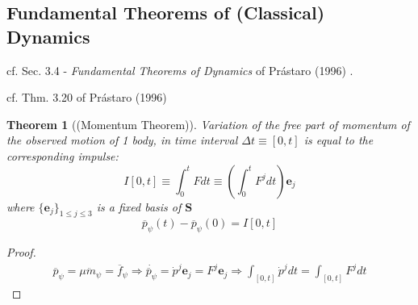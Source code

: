 \documentclass[10pt]{amsart}
\newtheorem{theorem}{Theorem}
\begin{document}
\begin{multicols*}{2}
\subsection{Fundamental Theorems of (Classical) Dynamics}

cf. Sec. 3.4 - \emph{Fundamental Theorems of Dynamics} of Pr\'{a}staro (1996) \cite{Pras1996}.

cf. Thm. 3.20 of Pr\'{a}staro (1996) \cite{Pras1996}
\begin{theorem}[(Momentum Theorem)]
	Variation of the free part of momentum of the observed motion of 1 body, in time interval $\Delta t \equiv [0, t]$ is equal to the corresponding impulse:
	\begin{equation}
	I[0,t] \equiv \int_0^t Fdt \equiv \left( \int_0^t F^j dt \right) \mathbf{e}_j
	\end{equation}
	where $\lbrace \mathbf{e}_j \rbrace_{1 \leq j \leq 3}$ is a fixed basis of $\mathbf{S}$
	\begin{equation}
		\overline{p}_{\psi}(t) - \overline{p}_{\psi}(0) = I[0,t]
	\end{equation}
\end{theorem}

\begin{proof}
	\[
\begin{gathered}
\overline{p}_{\psi} = \mu \ddot{m}_{\psi} = \overline{f}_{\psi} \Longrightarrow \dot{ \overline{p}_{\psi}} = \dot{p}^j \mathbf{e}_j = F^j \textbf{e}_j \Longrightarrow \int_{[0,t]} \dot{p}^j dt = \int_{[0,t]}F^j dt
\end{gathered}
	\]
	\end{proof}


\end{multicols*}
\end{document}
